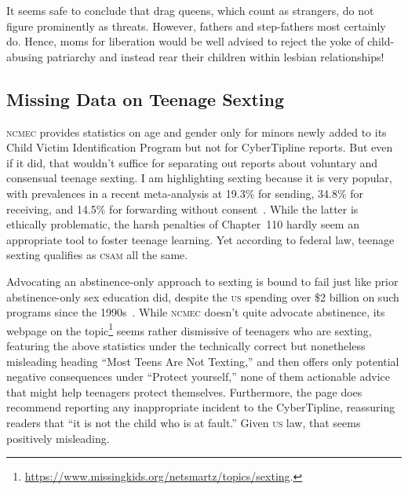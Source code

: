 \documentclass[nonacm,screen]{acmart}
\newcommand\V[1]{\textsc{\MakeLowercase{#1}}}
\begin{document}
It seems safe to conclude that drag queens, which count as strangers, do not
figure prominently as threats. However, fathers and step-fathers most certainly
do. Hence, moms for liberation would be well advised to reject the yoke of
child-abusing patriarchy and instead rear their children within lesbian
relationships!


\subsection{Missing Data on Teenage Sexting}

\V{NCMEC} provides statistics on age and gender only for minors newly added to
its Child Victim Identification Program but not for CyberTipline reports. But
even if it did, that wouldn't suffice for separating out reports about voluntary
and consensual teenage sexting. I am highlighting sexting because it is very
popular, with prevalences in a recent meta-analysis at 19.3\% for sending,
34.8\% for receiving, and 14.5\% for forwarding without
consent~\cite{MoriParkea2022}. While the latter is ethically problematic, the
harsh penalties of Chapter~110 hardly seem an appropriate tool to foster teenage
learning. Yet according to federal law, teenage sexting qualifies as \V{CSAM}
all the same.

Advocating an abstinence-only approach to sexting is bound to fail just like
prior abstinence-only sex education did, despite the \V{US} spending over \$2
billion on such programs since the 1990s~\cite{FoxHimmelsteinea2019}. While
\V{NCMEC} doesn't quite advocate abstinence, its webpage on the
topic\footnote{\url{https://www.missingkids.org/netsmartz/topics/sexting}.}
seems rather dismissive of teenagers who are sexting, featuring the above
statistics under the technically correct but nonetheless misleading heading
``Most Teens Are Not Texting,'' and then offers only potential negative
consequences under ``Protect yourself,'' none of them actionable advice that
might help teenagers protect themselves. Furthermore, the page does recommend
reporting any inappropriate incident to the CyberTipline, reassuring readers
that ``it is not the child who is at fault.'' Given \V{US} law, that seems
positively misleading.
\end{document}
